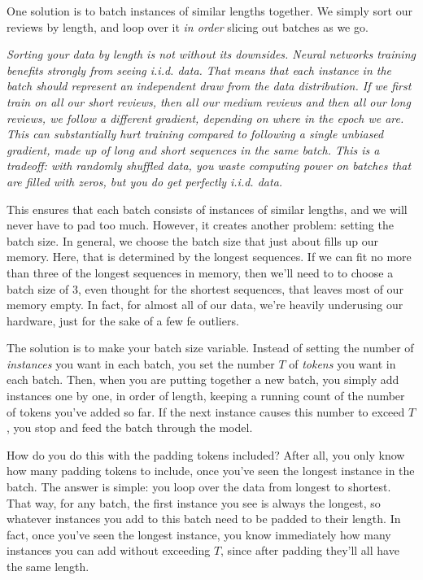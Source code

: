 \documentclass{pca}
\newenvironment{aside}{
	\setlength{\leftskip}{1em}\par\itshape
}{
	
	\setlength{\leftskip}{0em}\par
}
\theoremstyle{theorem}
\theoremstyle{definition}
\theoremstyle{proof}
\begin{document}
One solution is to batch instances of similar lengths together. We simply sort our reviews by length, and loop over it \emph{in order} slicing out batches as we go. 

\begin{aside} Sorting your data by length is not without its downsides. Neural networks training benefits strongly from seeing i.i.d. data. That means that each instance in the batch should represent an independent draw from the data distribution. If we first train on all our short reviews, then all our medium reviews and then all our long reviews, we follow a different gradient, depending on where in the epoch we are. This can substantially hurt training compared to following a single unbiased gradient, made up of long and short sequences in the same batch. This is a tradeoff: with randomly shuffled data, you waste computing power on batches that are filled with zeros, but you do get perfectly i.i.d. data. 
\end{aside}

This ensures that each batch consists of instances of similar lengths, and we will never have to pad too much. However, it creates another problem: setting the batch size. In general, we choose the batch size that just about fills up our memory. Here, that is determined by the longest sequences. If we can fit no more than three of the longest sequences in memory, then we'll need to to choose a batch size of 3, even thought for the shortest sequences, that leaves most of our memory empty. In fact, for almost all of our data, we're heavily underusing our hardware, just for the sake of a few fe outliers.

The solution is to make your batch size variable. Instead of setting the number of \emph{instances} you want in each batch, you set the number $T$ of \emph{tokens} you want in each batch. Then, when you are putting together a new batch, you simply add instances one by one, in order of length, keeping a running count of the number of tokens you've added so far. If the next instance causes this number to exceed $T$, you stop and feed the batch through the model.

How do you do this with the padding tokens included? After all, you only know how many padding tokens to include, once you've seen the longest instance in the batch. The answer is simple: you loop over the data from longest to shortest. That way, for any batch, the first instance you see is always the longest, so whatever instances you add to this batch need to be padded to their length. In fact, once you've seen the longest instance, you know immediately how many instances you can add without exceeding $T$, since after padding they'll all have the same length. 
\end{document}
